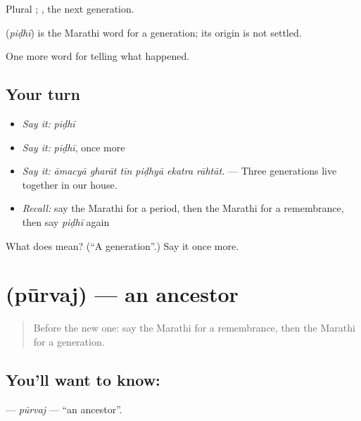 Plural ;  , the next generation.

\begin{cousinweb}
\textbf{} (\emph{piḍhī}) is the Marathi word for a generation; its origin is not settled.
\end{cousinweb}

\begin{grammarlens}[title={What you've built}]
One more word for telling what happened.
\end{grammarlens}

\subsection*{Your turn}
\begin{itemize}
\raggedright
  \item \emph{Say it:} \emph{piḍhī}
  \item \emph{Say it:} \emph{piḍhī}, once more
  \item \emph{Say it:} \emph{āmacyā gharāt tīn piḍhyā ekatra rāhtāt.} — Three generations live together in our house.
  \item \emph{Recall:} say the Marathi for a period, then the Marathi for a remembrance, then say \emph{piḍhī} again
\end{itemize}

\begin{tcolorbox}[breakable,colback=teal!4,colframe=teal!35!black,title={Before you move on}]
What does  mean? (\textquotedblleft{}A generation\textquotedblright{}.) Say it once more.
\end{tcolorbox}
\section[\texorpdfstring{\mr{पूर्वज} (pūrvaj)}{पूर्वज (pūrvaj)}]{ (pūrvaj) — an ancestor}

\label{lesson:MR-C308-purvaj}



\begin{quote}
Before the new one: say the Marathi for a remembrance, then the Marathi for a generation.
\end{quote}

\subsection*{You'll want to know: }
\textbf{} — \emph{pūrvaj} — \textquotedblleft{}an ancestor\textquotedblright{}.

